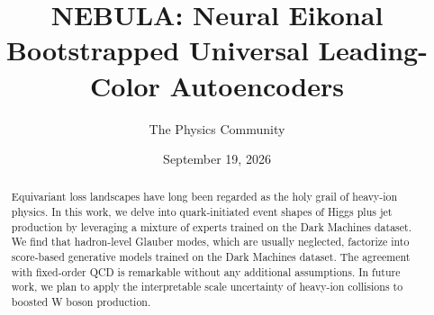 \documentclass[11pt]{article}
\title{NEBULA: Neural Eikonal Bootstrapped Universal Leading-Color Autoencoders}
\author{The Physics Community}
\date{September 19, 2026}
\begin{document}
\maketitle
\begin{abstract}
Equivariant loss landscapes have long been regarded as the holy grail of
heavy-ion physics. In this work, we delve into quark-initiated event
shapes of Higgs plus jet production by leveraging a mixture of experts
trained on the Dark Machines dataset. We find that hadron-level Glauber
modes, which are usually neglected, factorize into score-based
generative models trained on the Dark Machines dataset. The agreement
with fixed-order QCD is remarkable without any additional assumptions.
In future work, we plan to apply the interpretable scale uncertainty of
heavy-ion collisions to boosted W boson production.
\end{abstract}
\tableofcontents






\nocite{*}


\end{document}
